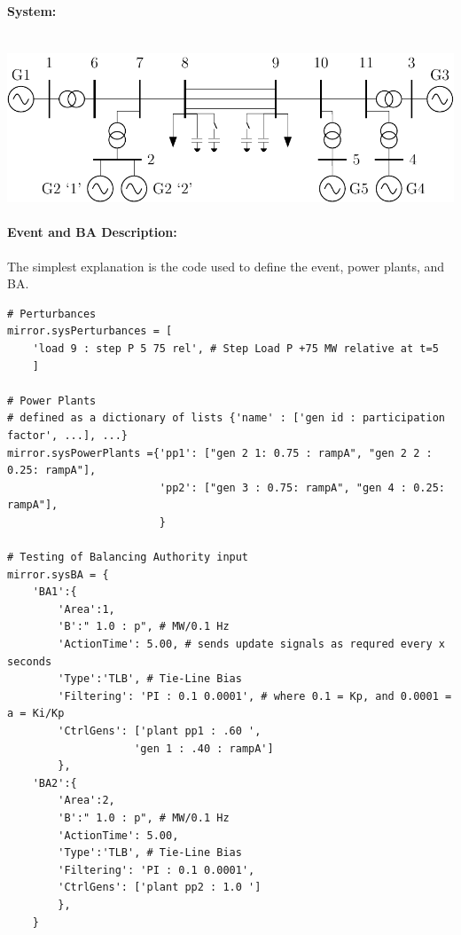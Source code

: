 \documentclass[12pt]{article}
\begin{document}
\paragraph{System:} \ \\
\includegraphics[width=\linewidth]{../../models/sixMachine/sixMachine}
\paragraph{Event and BA Description:} The simplest explanation is the code used to define the event, power plants, and BA.
\begin{Verbatim}
# Perturbances
mirror.sysPerturbances = [
    'load 9 : step P 5 75 rel', # Step Load P +75 MW relative at t=5
    ]

# Power Plants
# defined as a dictionary of lists {'name' : ['gen id : participation factor', ...], ...}
mirror.sysPowerPlants ={'pp1': ["gen 2 1: 0.75 : rampA", "gen 2 2 : 0.25: rampA"],
                        'pp2': ["gen 3 : 0.75: rampA", "gen 4 : 0.25: rampA"],
                        }

# Testing of Balancing Authority input
mirror.sysBA = {
    'BA1':{
        'Area':1,
        'B':" 1.0 : p", # MW/0.1 Hz
        'ActionTime': 5.00, # sends update signals as requred every x seconds
        'Type':'TLB', # Tie-Line Bias
        'Filtering': 'PI : 0.1 0.0001', # where 0.1 = Kp, and 0.0001 = a = Ki/Kp
        'CtrlGens': ['plant pp1 : .60 ',
                    'gen 1 : .40 : rampA']
        },
    'BA2':{
        'Area':2,
        'B':" 1.0 : p", # MW/0.1 Hz
        'ActionTime': 5.00,
        'Type':'TLB', # Tie-Line Bias
        'Filtering': 'PI : 0.1 0.0001',
        'CtrlGens': ['plant pp2 : 1.0 ']
        },
    }
\end{Verbatim}

\pagebreak
\end{document}
